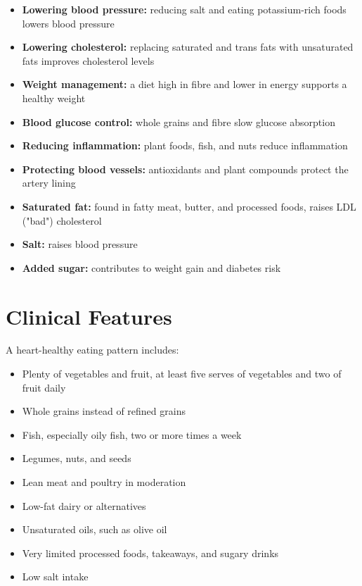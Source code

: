 \begin{itemize}
    \item \textbf{Lowering blood pressure:} reducing salt and eating potassium-rich foods lowers blood pressure
    \item \textbf{Lowering cholesterol:} replacing saturated and trans fats with unsaturated fats improves cholesterol levels
    \item \textbf{Weight management:} a diet high in fibre and lower in energy supports a healthy weight
    \item \textbf{Blood glucose control:} whole grains and fibre slow glucose absorption
    \item \textbf{Reducing inflammation:} plant foods, fish, and nuts reduce inflammation
    \item \textbf{Protecting blood vessels:} antioxidants and plant compounds protect the artery lining
    \item \textbf{Saturated fat:} found in fatty meat, butter, and processed foods, raises LDL ("bad") cholesterol
    \item \textbf{Salt:} raises blood pressure
    \item \textbf{Added sugar:} contributes to weight gain and diabetes risk
\end{itemize}

\section*{Clinical Features}
A heart-healthy eating pattern includes:

\begin{itemize}
    \item Plenty of vegetables and fruit, at least five serves of vegetables and two of fruit daily
    \item Whole grains instead of refined grains
    \item Fish, especially oily fish, two or more times a week
    \item Legumes, nuts, and seeds
    \item Lean meat and poultry in moderation
    \item Low-fat dairy or alternatives
    \item Unsaturated oils, such as olive oil
    \item Very limited processed foods, takeaways, and sugary drinks
    \item Low salt intake
\end{itemize}

